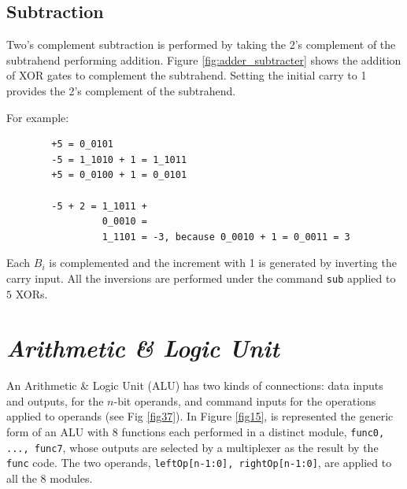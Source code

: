 \subsection{Subtraction}

Two's complement subtraction is performed by taking the 2's complement of the subtrahend performing addition. Figure \ref{fig:adder_subtracter} shows the addition of XOR gates to complement the subtrahend. Setting the initial carry to 1 provides the 2's complement of the subtrahend.

For example:
\begin{verbatim}
        +5 = 0_0101
        -5 = 1_1010 + 1 = 1_1011
        +5 = 0_0100 + 1 = 0_0101

        -5 + 2 = 1_1011 +
                 0_0010 =
                 1_1101 = -3, because 0_0010 + 1 = 0_0011 = 3
\end{verbatim}

Each $B_i$ is complemented and the increment with 1 is generated by inverting the carry input. All the inversions are performed under the command {\tt sub} applied to $5$ XORs.





\section{{\bf {\em Arithmetic \& Logic Unit}}}\label{alu1}

An Arithmetic \& Logic Unit (ALU) has two kinds of connections: data inputs and outputs, for the $n$-bit operands, and command inputs for the operations applied to operands (see Fig \ref{fig37}). In Figure \ref{fig15}, is represented the generic form of an ALU with 8 functions each performed in a distinct module, {\tt func0, ..., func7}, whose outputs are selected by a multiplexer as the result by the {\tt func} code. The two operands, {\tt leftOp[n-1:0], rightOp[n-1:0]}, are applied to all the 8 modules.




